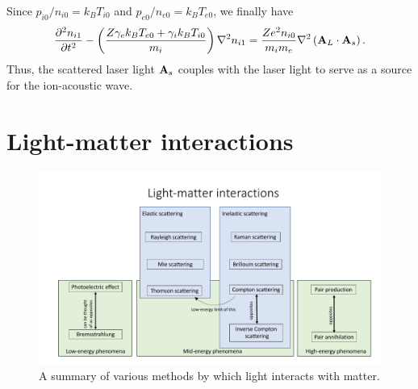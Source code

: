 \documentclass[a4paper,11pt]{report}
\begin{document}
Since $p_{i0}/n_{i0} = k_B T_{i0}$ and $p_{e0} / n_{e0} = k_B T_{e0}$, we finally have
\begin{equation}
    \frac{\partial^2 n_{i1}}{\partial t^2} - \left ( \frac{Z \gamma_e k_B T_{e0} + \gamma_i k_B T_{i0}}{m_i} \right ) \nabla^2 n_{i1} = \frac{Z e^2 n_{i0}}{m_i m_e} \nabla^2 \left (\mathbf{A}_L \cdot \mathbf{A}_s \right ).
\end{equation}
Thus, the scattered laser light $\mathbf{A}_s$ couples with the laser light to serve as a source for the ion-acoustic wave.

\appendix

\chapter{Light-matter interactions}
\begin{figure}[ht]
    \centering
    \includegraphics[width=15cm]{../../images/light_matter.pdf}
    \caption{A summary of various methods by which light interacts with matter.}
    \label{fig:light_matter}
\end{figure}

\end{document}
